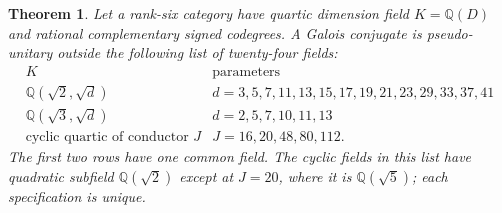\documentclass[11pt,reqno]{amsart}
\newtheorem{theorem}{Theorem}[section]
\theoremstyle{remark}\newtheorem{remark}[theorem]{Remark}
\numberwithin{equation}{section}
\begin{document}
\begin{theorem}\label{thm:quartic-rational-frontier}
Let a rank-six category have quartic dimension field $K=\mathbb Q(D)$
and rational complementary signed codegrees. A Galois conjugate is pseudo-unitary outside
the following list of twenty-four fields:
\[
\begin{array}{c|l}
 K&\text{parameters}\\\hline
 \mathbb Q(\sqrt2,\sqrt d)&d=3,5,7,11,13,15,17,19,21,23,29,33,37,41\\
 \mathbb Q(\sqrt3,\sqrt d)&d=2,5,7,10,11,13\\
 \text{cyclic quartic of conductor }J&J=16,20,48,80,112 .
\end{array}
\]
The first two rows have one common field. The cyclic fields in this
list have quadratic subfield $\mathbb Q(\sqrt2)$ except at $J=20$,
where it is $\mathbb Q(\sqrt5)$; each specification is unique.
\end{theorem}
\end{document}
